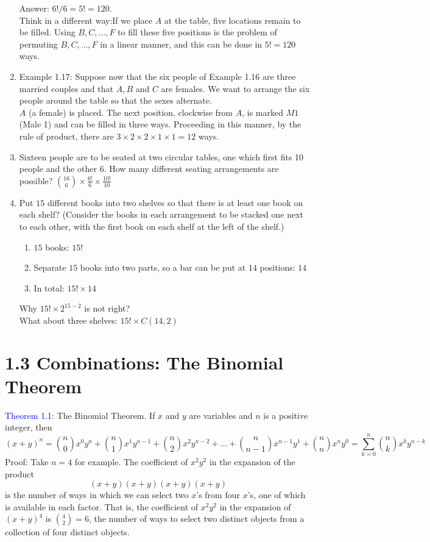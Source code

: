 \documentclass[a4paper]{article}
\begin{document}
\begin{enumerate}
    Answer: $6!/6=5!=120$.\\
    Think in a different way:If we place $A$ at the table, five locations remain to be filled. Using $B,C,\ldots, F$ to fill these five positions is the problem of permuting $B,C,\ldots, F$ in a linear manner, and this can be done in $5!=120$ ways.
    \item Example 1.17: Suppose now that the six people of Example 1.16 are three married couples and that $A,B$ and $C$ are females. We want to arrange the six people around the table so that the sexes alternate.\\
    $A$ (a female) is placed. The next position, clockwise from $A$, is marked $M1$ (Male 1) and can be filled in three ways. Proceeding in this manner, by the rule of product, there are $3\times 2\times 2\times 1\times 1=12$ ways.
    \item Sixteen people are to be seated at two circular tables, one which first fits 10 people and the other 6. How many different seating arrangements are possible? $\binom{16}{6}\times \frac{6!}{6}\times \frac{10!}{10}$
    \item Put $15$ different books into two shelves so that there is at least one book on each shelf? (Consider the books in each arrangement to be stacked one next to each other, with the first book on each shelf at the left of the shelf.)
    \begin{enumerate}
        \item $15$ books: $15!$
        \item Separate $15$ books into two parts, so a bar can be put at $14$ positions: $14$
        \item In total: $15!\times 14$
    \end{enumerate}
    Why $15!\times 2^{15-2}$ is not right?\\
    What about three shelves: $15!\times C(14,2)$
    
\end{enumerate}

\section*{1.3 Combinations: The Binomial Theorem}
\textcolor{blue}{Theorem 1.1}: The Binomial Theorem. If $x$ and $y$ are variables and $n$ is a positive integer, then
$$
(x+y)^n=\binom{n}{0}x^0y^n+\binom{n}{1}x^1y^{n-1}+\binom{n}{2}x^2y^{n-2}+\dots+\binom{n}{n-1}x^{n-1}y^1+\binom{n}{n}x^{n}y^0=\sum_{k=0}^n\binom{n}{k}x^ky^{n-k}
$$
Proof: Take $n=4$ for example. The coefficient of $x^2y^2$ in the expansion of the product 
$$
(x+y)(x+y)(x+y)(x+y)
$$
is the number of ways in which we can select two $x$'s from four $x$'s, one of which is available in each factor. That is, the coefficient of $x^2y^2$ in the expansion of $(x+y)^4$ is $\binom{4}{2}=6$, the number of ways to select two distinct objects from a collection of four distinct objects.
\end{document}
